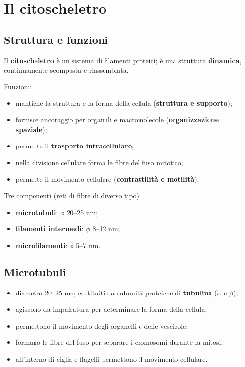 \section{Il citoscheletro}

\subsection{Struttura e funzioni}

Il \textbf{citoscheletro} è un sistema di filamenti proteici; è una struttura \textbf{dinamica}, continuamente scomposta e riassemblata.

Funzioni:
\begin{itemize}
  \item mantiene la struttura e la forma della cellula (\textbf{struttura e supporto});
  \item fornisce ancoraggio per organuli e macromolecole (\textbf{organizzazione spaziale});
  \item permette il \textbf{trasporto intracellulare};
  \item nella divisione cellulare forma le fibre del fuso mitotico;
  \item permette il movimento cellulare (\textbf{contrattilità e motilità}).
\end{itemize}

Tre componenti (reti di fibre di diverso tipo):
\begin{itemize}
  \item \textbf{microtubuli}: $\phi$ 20--25 nm;
  \item \textbf{filamenti intermedi}: $\phi$ 8--12 nm;
  \item \textbf{microfilamenti}: $\phi$ 5--7 nm.
\end{itemize}

\subsection{Microtubuli}

\begin{itemize}
  \item diametro 20--25 nm; costituiti da subunità proteiche di \textbf{tubulina} ($\alpha$ e $\beta$);
  \item agiscono da impalcatura per determinare la forma della cellula;
  \item permettono il movimento degli organelli e delle vescicole;
  \item formano le fibre del fuso per separare i cromosomi durante la mitosi;
  \item all'interno di ciglia e flagelli permettono il movimento cellulare.
\end{itemize}

